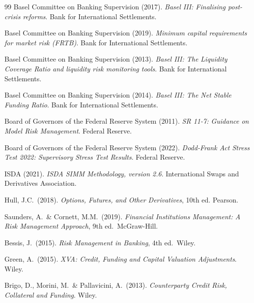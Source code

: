 \documentclass[12pt,a4paper]{article}
\begin{document}
\newpage
\begin{thebibliography}{99}
  Basel Committee on Banking Supervision (2017).
  \textit{Basel III: Finalising post-crisis reforms}.
  Bank for International Settlements.

  Basel Committee on Banking Supervision (2019).
  \textit{Minimum capital requirements for market risk (FRTB)}.
  Bank for International Settlements.

  Basel Committee on Banking Supervision (2013).
  \textit{Basel III: The Liquidity Coverage Ratio and liquidity risk
  monitoring tools}.
  Bank for International Settlements.

  Basel Committee on Banking Supervision (2014).
  \textit{Basel III: The Net Stable Funding Ratio}.
  Bank for International Settlements.

  Board of Governors of the Federal Reserve System (2011).
  \textit{SR 11-7: Guidance on Model Risk Management}.
  Federal Reserve.

  Board of Governors of the Federal Reserve System (2022).
  \textit{Dodd-Frank Act Stress Test 2022: Supervisory Stress Test Results}.
  Federal Reserve.

  ISDA (2021).
  \textit{ISDA SIMM Methodology, version 2.6}.
  International Swaps and Derivatives Association.

  Hull, J.C.\ (2018).
  \textit{Options, Futures, and Other Derivatives}, 10th ed.
  Pearson.

  Saunders, A.\ \& Cornett, M.M.\ (2019).
  \textit{Financial Institutions Management: A Risk Management Approach},
  9th ed.\ McGraw-Hill.

  Bessis, J.\ (2015).
  \textit{Risk Management in Banking}, 4th ed.\ Wiley.

  Green, A.\ (2015).
  \textit{XVA: Credit, Funding and Capital Valuation Adjustments}.
  Wiley.

  Brigo, D., Morini, M.\ \& Pallavicini, A.\ (2013).
  \textit{Counterparty Credit Risk, Collateral and Funding}.
  Wiley.
\end{thebibliography}
\end{document}
